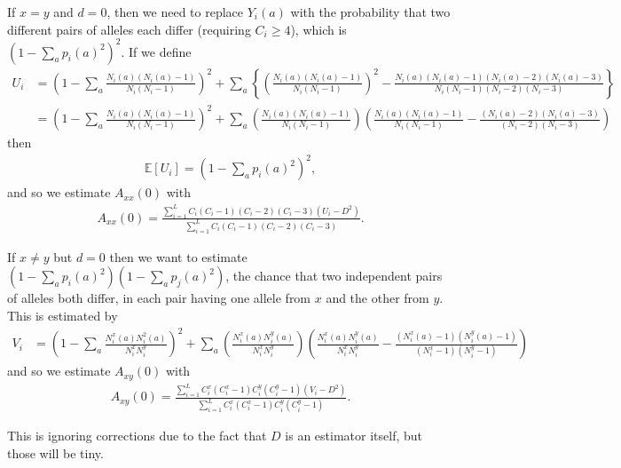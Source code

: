 \documentclass{article}
\newcommand{\E}{\mathbb{E}}
\begin{document}
If $x=y$ and $d=0$, then we need to replace $Y_i(a)$ with
the probability that two different pairs of alleles each differ
(requiring $C_i \ge 4$),
which is 
$(1-\sum_a p_i(a)^2)^2$.
If we define
\begin{align}
    U_i &= \left(1 - \sum_a \frac{ N_i(a) (N_i(a)-1) }{ N_i (N_i-1) } \right)^2 
        + \sum_a \left\{ 
            \left( \frac{ N_i(a) (N_i(a)-1) }{ N_i (N_i-1) } \right)^2
            - \frac{ N_i(a) (N_i(a)-1) (N_i(a)-2) (N_i(a)-3) }{ N_i (N_i-1) (N_i-2) (N_i-3) } 
        \right\} \\
        &= \left(1 - \sum_a \frac{ N_i(a) (N_i(a)-1) }{ N_i (N_i-1) } \right)^2 
        + \sum_a \left( \frac{ N_i(a) (N_i(a)-1) }{ N_i (N_i-1) } \right)
        \left( \frac{ N_i(a) (N_i(a)-1) }{ N_i (N_i-1) } - \frac{ (N_i(a)-2) (N_i(a)-3) }{ (N_i-2) (N_i-3) }  \right)
\end{align}
then
\begin{align}
    \E[ U_i ] = (1-\sum_a p_i(a)^2)^2 ,
\end{align}
and so we estimate $A_{xx}(0)$ with
\begin{align}
    A_{xx}(0) = \frac{ \sum_{i=1}^L C_i (C_i-1) (C_i-2) (C_i-3) (U_i-D^2)  }{ \sum_{i=1}^L C_i (C_i-1) (C_i-2) (C_i-3) }. 
\end{align}

If $x \neq y$ but $d=0$
then we want to estimate $(1-\sum_a p_i(a)^2)(1-\sum_a p_j(a)^2)$,
the chance that two independent pairs of alleles both differ,
in each pair having one allele from $x$ and the other from $y$.
This is estimated by
\begin{align}
    V_i &= \left(1 - \sum_a \frac{ N^x_i(a) N^2_i(a) }{ N^x_i N^y_i } \right)^2
    + \sum_a 
        \left( \frac{ N^x_i(a) N^y_i(a) }{ N^x_i N^y_i } \right)
        \left(
            \frac{ N^x_i(a) N^y_i(a) }{ N^x_i N^y_i } 
            - \frac{ (N^x_i(a)-1) (N^y_i(a)-1) }{ (N^x_i-1) (N^y_i-1) } 
        \right)
\end{align}
and so we estimate $A_{xy}(0)$ with
\begin{align}
    A_{xy}(0) = \frac{ \sum_{i=1}^L C^x_i (C^x_i-1) C^y_i (C^y_i-1) (V_i-D^2) }{ \sum_{i=1}^L C^x_i (C^x_i-1) C^y_i (C^y_i-1) }. 
\end{align}

This is ignoring corrections due to the fact that $D$ is an estimator itself,
but those will be tiny.
\end{document}
